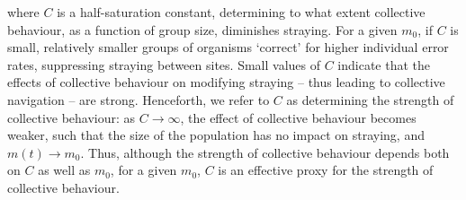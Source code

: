 \documentclass{revtex4}
\begin{document}
\noindent where $C$ is a half-saturation constant, determining to what extent collective behaviour, as a function of group size, diminishes straying.
For a given $m_0$, if $C$ is small, relatively smaller groups of organisms `correct' for higher individual error rates, suppressing straying between sites.
Small values of $C$ indicate that the effects of collective behaviour on modifying straying -- thus leading to collective navigation -- are strong.
Henceforth, we refer to $C$ as determining the strength of collective behaviour: as $C\rightarrow\infty$, the effect of collective behaviour becomes weaker, such that the size of the population has no impact on straying, and $m(t)\rightarrow m_0$.
Thus, although the strength of collective behaviour depends both on $C$ as well as $m_0$, for a given $m_0$, $C$ is an effective proxy for the strength of collective behaviour.
\end{document}

